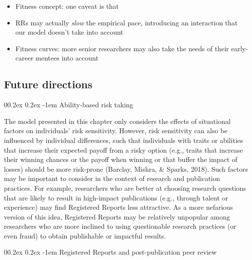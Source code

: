 \documentclass[
  ,man,mask,floatsintext]{apa6}
\makeatletter
\let\oldparagraph\paragraph
\renewcommand{\paragraph}[1]{\oldparagraph{#1}\mbox{}}
\renewcommand{\paragraph}{\@startsection{paragraph}{4}{\parindent}%
  {0\baselineskip \@plus 0.2ex \@minus 0.2ex}%
  {-1em}%
  {\normalfont\normalsize\bfseries\itshape\typesectitle}}
\makeatother
\begin{document}
\begin{itemize}
\item
  Fitness concept: one caveat is that
\item
  RRs may actually \emph{slow} the empirical pace, introducing an interaction that our model doesn't take into account
\item
  Fitness curves: more senior researchers may also take the needs of their early-career mentees into account
\end{itemize}

\hypertarget{future-directions}{%
\subsection{Future directions}\label{future-directions}}

\hypertarget{ability-based-risk-taking}{%
\paragraph{Ability-based risk taking}\label{ability-based-risk-taking}}

The model presented in this chapter only considers the effects of situational factors on individuals' risk sensitivity.
However, risk sensitivity can also be influenced by individual differences, such that individuals with traits or abilities that increase their expected payoff from a risky option (e.g., traits that increase their winning chances or the payoff when winning or that buffer the impact of losses) should be more risk-prone (Barclay, Mishra, \& Sparks, 2018).
Such factors may be important to consider in the context of research and publication practices.
For example, researchers who are better at choosing research questions that are likely to result in high-impact publications (e.g., through talent or experience) may find Registered Reports less attractive.
As a more nefarious version of this idea, Registered Reports may be relatively unpopular among researchers who are more inclined to using questionable research practices (or even fraud) to obtain publishable or impactful results.

\hypertarget{registered-reports-and-post-publication-peer-review}{%
\paragraph{Registered Reports and post-publication peer review}\label{registered-reports-and-post-publication-peer-review}}
\end{document}
